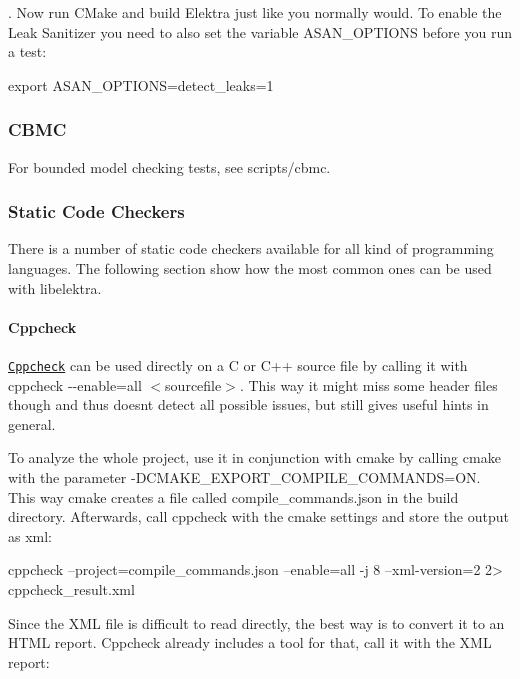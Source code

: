 . Now run C\+Make and build Elektra just like you normally would. To enable the Leak Sanitizer you need to also set the variable {\ttfamily A\+S\+A\+N\+\_\+\+O\+P\+T\+I\+O\+NS} before you run a test\+:


\begin{DoxyCode}
export ASAN\_OPTIONS=detect\_leaks=1
\end{DoxyCode}


\subsubsection*{C\+B\+MC}

For bounded model checking tests, see {\ttfamily scripts/cbmc}.

\subsubsection*{Static Code Checkers}

There is a number of static code checkers available for all kind of programming languages. The following section show how the most common ones can be used with {\ttfamily libelektra}.

\paragraph*{Cppcheck}

\href{http://cppcheck.sourceforge.net/}{\tt Cppcheck} can be used directly on a C or C++ source file by calling it with {\ttfamily cppcheck -\/-\/enable=all $<$sourcefile$>$}. This way it might miss some header files though and thus doesn\textquotesingle{}t detect all possible issues, but still gives useful hints in general.

To analyze the whole project, use it in conjunction with {\ttfamily cmake} by calling {\ttfamily cmake} with the parameter {\ttfamily -\/\+D\+C\+M\+A\+K\+E\+\_\+\+E\+X\+P\+O\+R\+T\+\_\+\+C\+O\+M\+P\+I\+L\+E\+\_\+\+C\+O\+M\+M\+A\+N\+DS=ON}. This way {\ttfamily cmake} creates a file called {\ttfamily compile\+\_\+commands.\+json} in the build directory. Afterwards, call {\ttfamily cppcheck} with the cmake settings and store the output as xml\+:


\begin{DoxyCode}
cppcheck --project=compile\_commands.json --enable=all -j 8 --xml-version=2 2> cppcheck\_result.xml
\end{DoxyCode}


Since the X\+ML file is difficult to read directly, the best way is to convert it to an H\+T\+ML report. Cppcheck already includes a tool for that, call it with the X\+ML report\+:


